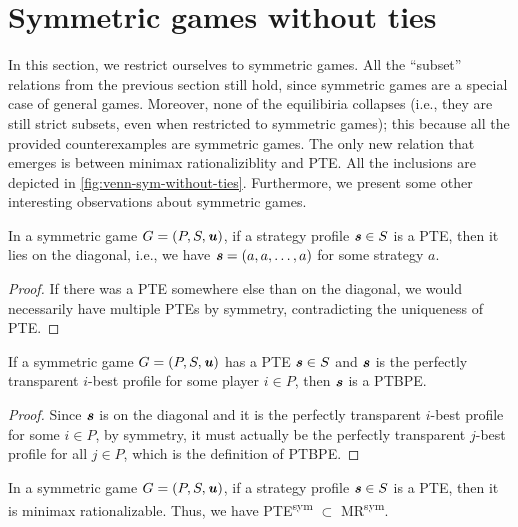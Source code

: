 \section{Symmetric games without ties}
In this section, we restrict ourselves to symmetric games.
All the \enquote{subset} relations from the previous section still hold, since symmetric games are a special case of general games.
Moreover, none of the equilibiria collapses (i.e., they are still strict subsets, even when restricted to symmetric games); this because all the provided counterexamples are symmetric games.
The only new relation that emerges is between minimax rationaliziblity and PTE.
All the inclusions are depicted in \autoref{fig:venn-sym-without-ties}.
Furthermore, we present some other interesting observations about symmetric games.

\begin{observation}
	 In a symmetric game $G = (P, S, \boldsymbol{\mathit{u}})$, if a strategy profile $\boldsymbol{\mathit{s}} \in S$ is a PTE, then it lies on the diagonal, i.e., we have $\boldsymbol{\mathit{s}} = (a, a, \dots, a)$ for some strategy $a$.
\end{observation}

\begin{proof}
	If there was a PTE somewhere else than on the diagonal, we would necessarily have multiple PTEs by symmetry, contradicting the uniqueness of PTE.
\end{proof}

\begin{corollary}
	If a symmetric game $G = (P, S, \boldsymbol{\mathit{u}})$ has a PTE $\boldsymbol{\mathit{s}} \in S$ and $\boldsymbol{\mathit{s}}$ is the perfectly transparent $i$-best profile for some player $i \in P$, then $\boldsymbol{\mathit{s}}$ is a PTBPE. 
\end{corollary}

\begin{proof}
	Since $\boldsymbol{\mathit{s}}$ is on the diagonal and it is the perfectly transparent $i$-best profile for some $i \in P$, by symmetry, it must actually be the perfectly transparent $j$-best profile for all $j \in P$, which is the definition of PTBPE.
\end{proof}

\begin{lemma}
	In a symmetric game $G = (P, S, \boldsymbol{\mathit{u}})$, if a strategy profile $\boldsymbol{\mathit{s}} \in S$ is a PTE, then it is minimax rationalizable.
	Thus, we have PTE\textsuperscript{sym} $\subset$ MR\textsuperscript{sym}.
\end{lemma}

